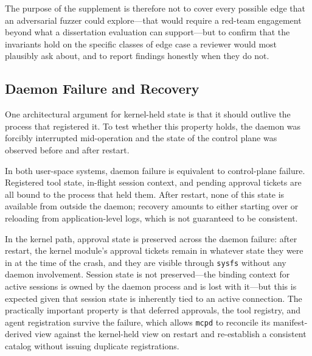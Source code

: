 The purpose of the supplement is therefore not to cover every possible edge that an adversarial fuzzer could explore---that would require a red-team engagement beyond what a dissertation evaluation can support---but to confirm that the invariants hold on the specific classes of edge case a reviewer would most plausibly ask about, and to report findings honestly when they do not.


\subsection{Daemon Failure and Recovery}

One architectural argument for kernel-held state is that it should outlive the process that registered it. To test whether this property holds, the daemon was forcibly interrupted mid-operation and the state of the control plane was observed before and after restart.


In both user-space systems, daemon failure is equivalent to control-plane failure. Registered tool state, in-flight session context, and pending approval tickets are all bound to the process that held them. After restart, none of this state is available from outside the daemon; recovery amounts to either starting over or reloading from application-level logs, which is not guaranteed to be consistent.

In the kernel path, approval state is preserved across the daemon failure: after restart, the kernel module's approval tickets remain in whatever state they were in at the time of the crash, and they are visible through \texttt{sysfs} without any daemon involvement. Session state is not preserved---the binding context for active sessions is owned by the daemon process and is lost with it---but this is expected given that session state is inherently tied to an active connection. The practically important property is that deferred approvals, the tool registry, and agent registration survive the failure, which allows \texttt{mcpd} to reconcile its manifest-derived view against the kernel-held view on restart and re-establish a consistent catalog without issuing duplicate registrations.

